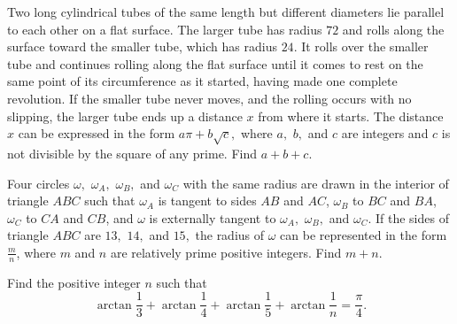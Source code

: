 \begin{question}[name={2007 AIME II, \href{https://artofproblemsolving.com/community/c4p798330}{Problem 11}}]
	Two long cylindrical tubes of the same length but different diameters lie parallel to each other on a flat surface. The larger tube has radius $72$ and rolls along the surface toward the smaller tube, which has radius $24$. It rolls over the smaller tube and continues rolling along the flat surface until it comes to rest on the same point of its circumference as it started, having made one complete revolution. If the smaller tube never moves, and the rolling occurs with no slipping, the larger tube ends up a distance $x$ from where it starts. The distance $x$ can be expressed in the form $a\pi+b\sqrt{c},$ where $a,$ $b,$ and $c$ are integers and $c$ is not divisible by the square of any prime. Find $a+b+c$.
\end{question}


%	









\begin{question}[name={2007 AIME II, \href{https://artofproblemsolving.com/community/c4p798351}{Problem 15}}]
	Four circles $\omega,$ $\omega_{A},$ $\omega_{B},$ and $\omega_{C}$ with the same radius are drawn in the interior of triangle $ABC$ such that $\omega_{A}$ is tangent to sides $AB$ and $AC$, $\omega_{B}$ to $BC$ and $BA$, $\omega_{C}$ to $CA$ and $CB$, and $\omega$ is externally tangent to $\omega_{A},$ $\omega_{B},$ and $\omega_{C}$. If the sides of triangle $ABC$ are $13,$ $14,$ and $15,$ the radius of $\omega$ can be represented in the form $\frac{m}{n}$, where $m$ and $n$ are relatively prime positive integers. Find $m+n$.
\end{question}


%	




\begin{question}[name={2008 AIME I, \href{https://artofproblemsolving.com/community/c4p1075233}{Problem 8}}]
	Find the positive integer $ n$ such that\[\arctan\frac{1}{3}+\arctan\frac{1}{4}+\arctan\frac{1}{5}+\arctan\frac{1}{n}=\frac{\pi}{4}.\]
\end{question}


